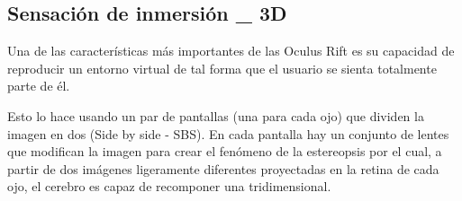 \documentclass[twoside, 11pt]{epstfg}
\begin{document}
%
%
%
%
%
%
%
%
%
%
%

\subsection{Sensación de inmersión \_ 3D}

Una de las características más importantes de las Oculus Rift es su capacidad de reproducir un entorno virtual de tal forma que el usuario se sienta totalmente parte de él.

Esto lo hace usando un par de pantallas (una para cada ojo) que dividen la imagen en dos (Side by side - SBS). En cada pantalla hay un conjunto de lentes que modifican la imagen para crear el fenómeno de la estereopsis por el cual, a partir de dos imágenes ligeramente diferentes proyectadas en la retina de cada ojo, el cerebro es capaz de recomponer una tridimensional.
\end{document}

